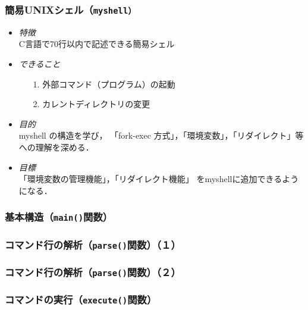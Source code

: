 \documentclass{beamer}                 %
\begin{document}
\begin{frame}[fragile]
  \frametitle{簡易UNIXシェル（\texttt{myshell）}}
  \begin{itemize}
  \item \emph{特徴}\\
    C言語で70行以内で記述できる簡易シェル
  \item \emph{できること}
    \begin{enumerate}
    \item[1.] 外部コマンド（プログラム）の起動
    \item[2.] カレントディレクトリの変更
    \end{enumerate}
  \item \emph{目的}\\
    myshell の構造を学び，
    「fork-exec 方式」，「環境変数」，「リダイレクト」等への理解を深める．
  \item \emph{目標}\\
    「環境変数の管理機能」，「リダイレクト機能」
    をmyshellに追加できるようになる．
  \end{itemize}
  \vfill
\end{frame}

\begin{frame}[fragile]
  \frametitle{基本構造（\texttt{main()}関数）}
\end{frame}

\begin{frame}[fragile]
  \frametitle{コマンド行の解析（\texttt{parse()}関数）（１）}
  \vfill
\end{frame}

\begin{frame}[fragile]
  \frametitle{コマンド行の解析（\texttt{parse()}関数）（２）}
\end{frame}

\begin{frame}[fragile]
  \frametitle{コマンドの実行（\texttt{execute()}関数）}
  \vfill
\end{frame}
\end{document}
